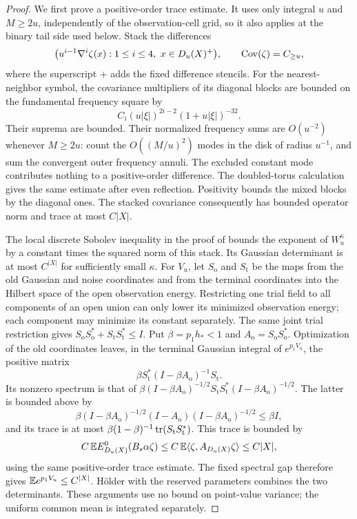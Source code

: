 \begin{proof}
We first prove a positive-order trace estimate.  It uses only integral
\(u\) and \(M\ge2u\), independently of the observation-cell grid,
so it also applies at the binary tail side used below.  Stack the
differences
\[
 \bigl(u^{i-1}\nabla^i\zeta(x):1\le i\le4,\ x\in D_u(X)^+\bigr),
 \qquad \operatorname{Cov}(\zeta)=C_{\ge u},
\]
where the superscript \(+\) adds the fixed difference stencils.
For the nearest-neighbor symbol, the covariance multipliers of its
diagonal blocks are bounded on the fundamental frequency square by
\[
 C_i(u|\xi|)^{2i-2}(1+u|\xi|)^{-32}.
\]
Their suprema are bounded.  Their normalized frequency sums are
\(O(u^{-2})\) whenever \(M\ge2u\): count the \(O((M/u)^2)\) modes in
the disk of radius \(u^{-1}\), and sum the convergent outer frequency
annuli.  The excluded constant mode contributes nothing to a
positive-order difference.  The doubled-torus calculation gives the
same estimate after even reflection.  Positivity bounds the mixed
blocks by the diagonal ones.  The stacked covariance consequently
has bounded operator norm and trace at most \(C|X|\).

The local discrete Sobolev inequality in the proof of
\cite[Lemma~4.4]{B} bounds the exponent of \(W_u^\kappa\) by a
constant times the squared norm of this stack.  Its Gaussian
determinant is at most \(C^{|X|}\) for sufficiently small \(\kappa\).
For \(V_u\), let \(S_{\mathrm o}\) and \(S_{\mathrm t}\) be the maps
from the old Gaussian and noise coordinates and from the terminal
coordinates into the Hilbert space of the open observation energy.
Restricting one trial field to all
components of an open union can only lower its minimized observation
energy; each component may minimize its constant separately.  The
same joint trial restriction gives
\(S_{\mathrm o}S_{\mathrm o}^*+S_{\mathrm t}S_{\mathrm t}^*\le I\).
Put \(\beta=p_1h_*<1\) and \(A_{\mathrm o}=S_{\mathrm o}S_{\mathrm o}^*\).
Optimization of the old coordinates leaves, in the terminal Gaussian
integral of \(e^{p_1V_u}\), the positive matrix
\[
 \beta S_{\mathrm t}^*(I-\beta A_{\mathrm o})^{-1}S_{\mathrm t}.
\]
Its nonzero spectrum is that of
\(\beta(I-\beta A_{\mathrm o})^{-1/2}
S_{\mathrm t}S_{\mathrm t}^*(I-\beta A_{\mathrm o})^{-1/2}\).
The latter is bounded above by
\[
 \beta(I-\beta A_{\mathrm o})^{-1/2}
 (I-A_{\mathrm o})(I-\beta A_{\mathrm o})^{-1/2}
 \le \beta I,
\]
and its trace is at most
\(\beta(1-\beta)^{-1}\operatorname{tr}(S_{\mathrm t}S_{\mathrm t}^*)\).
This trace is bounded by
\[
 C\,\mathbb E E_{D_u(X)}^0(B_s\alpha\zeta)
 \le C\,\mathbb E\langle \zeta,A_{D_u(X)}\zeta\rangle
 \le C|X|,
\]
using the same positive-order trace estimate.  The fixed spectral gap
therefore gives \(\mathbb E e^{p_1V_u}\le C^{|X|}\).  H\"older with the
reserved parameters combines the two determinants.  These arguments
use no bound on point-value variance; the uniform common mean is
integrated separately.
\end{proof}

